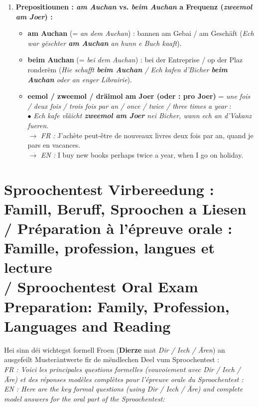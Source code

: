 \begin{enumerate}
    \item \textbf{Prepositiounen : \textit{am Auchan} vs. \textit{beim Auchan} a Frequenz (\textit{zweemol am Joer}) :}
    \begin{itemize}
        \item \textbf{am Auchan} (= \textit{an dem Auchan}) : bannen am Gebai / am Geschäft (\textit{Ech war gëschter \textbf{am Auchan} an hunn e Buch kaaft}).
        \item \textbf{beim Auchan} (= \textit{bei dem Auchan}) : bei der Entreprise / op der Plaz ronderëm (\textit{Hie schafft \textbf{beim Auchan} / Ech kafen d'Bicher \textbf{beim Auchan} oder an enger Librairie}).
        \item \textbf{eemol / zweemol / dräimol am Joer (oder : pro Joer)} = \textit{une fois / deux fois / trois fois par an / once / twice / three times a year} : \\
        $\bullet$ \textit{Ech kafe vläicht \textbf{zweemol am Joer} nei Bicher, wann ech an d'Vakanz fueren.} \\
        $\rightarrow$ \textit{FR :} J'achète peut-être de nouveaux livres deux fois par an, quand je pars en vacances. \\
        $\rightarrow$ \textit{EN :} I buy new books perhaps twice a year, when I go on holiday.
    \end{itemize}
\end{enumerate}

\vspace{1.5em}

\section[Sproochentest Virbereedung: Famill, Beruff, Sproochen \& Liesen]{Sproochentest Virbereedung : Famill, Beruff, Sproochen a Liesen \\/ Préparation à l'épreuve orale : Famille, profession, langues et lecture \\/ Sproochentest Oral Exam Preparation: Family, Profession, Languages and Reading}

Hei sinn déi wichtegst formell Froen (\textbf{Dierze} mat \textit{Dir / Iech / Ären}) an ausgefeilt Musteräntwerte fir de mëndlechen Deel vum Sproochentest : \\
\textit{FR : Voici les principales questions formelles (vouvoiement avec \textit{Dir / Iech / Äre}) et des réponses modèles complètes pour l'épreuve orale du Sproochentest :} \\
\textit{EN : Here are the key formal questions (using \textit{Dir / Iech / Äre}) and complete model answers for the oral part of the Sproochentest:}

